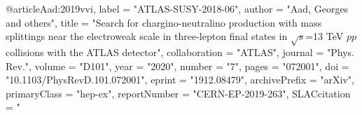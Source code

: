 @article{Aad:2019vvi,
      label          = "ATLAS-SUSY-2018-06",
      author         = "Aad, Georges and others",
      title          = "{Search for chargino-neutralino production with mass
                        splittings near the electroweak scale in three-lepton
                        final states in $\sqrt {s}$=13  TeV $pp$ collisions with
                        the ATLAS detector}",
      collaboration  = "ATLAS",
      journal        = "Phys. Rev.",
      volume         = "D101",
      year           = "2020",
      number         = "7",
      pages          = "072001",
      doi            = "10.1103/PhysRevD.101.072001",
      eprint         = "1912.08479",
      archivePrefix  = "arXiv",
      primaryClass   = "hep-ex",
      reportNumber   = "CERN-EP-2019-263",
      SLACcitation   = "%
}

